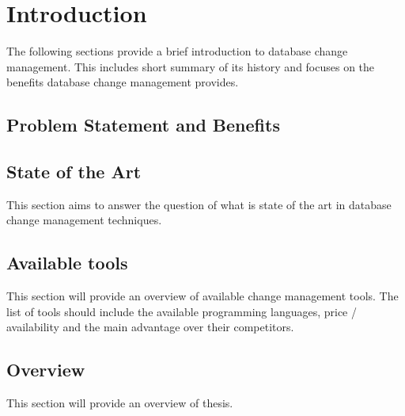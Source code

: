 

\chapter{Introduction}

The following sections provide a brief introduction to database change
management. This includes short summary of its history and focuses on
the benefits database change management provides.

\section{Problem Statement and Benefits}%


\section{State of the Art}%
This section aims to answer the question of what is state of the art in database change management techniques.

\section{Available tools}%
This section will provide an overview of available change management tools.
The list of tools should include the available programming languages, price / availability
and the main advantage over their competitors.

\section{Overview}%
This section will provide an overview of thesis.


\newpage